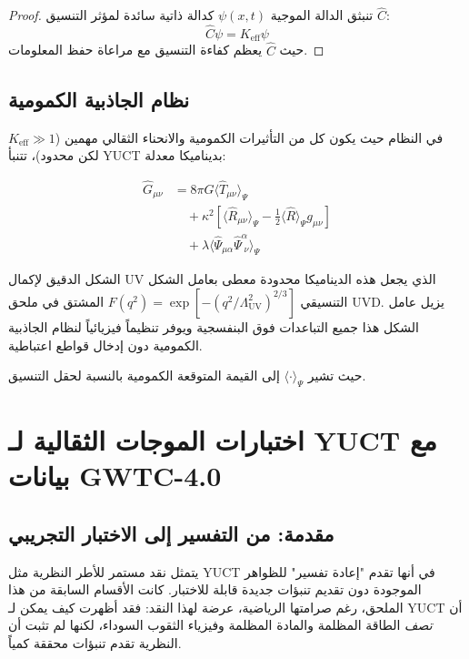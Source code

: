 \documentclass[11pt,a4paper]{article}
\theoremstyle{remark}
\newcommand{\Keff}{K_{\mathrm{eff}}}
\begin{document}
	\begin{proof}
		تنبثق الدالة الموجية $\psi(x,t)$ كدالة ذاتية سائدة لمؤثر التنسيق $\hat{C}$:
		\[
		\hat{C} \psi = \Keff \psi
		\]
		حيث $\hat{C}$ يعظم كفاءة التنسيق مع مراعاة حفظ المعلومات.
	\end{proof}
	
	\subsection{نظام الجاذبية الكمومية}
	
	في النظام حيث يكون كل من التأثيرات الكمومية والانحناء الثقالي مهمين ($\Keff \gg 1$ لكن محدود)، تتنبأ YUCT بديناميكا معدلة:
	
	\begin{equation}
		\begin{aligned}
			\hat{G}_{\mu\nu} &= 8\pi G \langle \hat{T}_{\mu\nu} \rangle_{\Psi} \\
			&\quad + \kappa^2 \left[ \langle \hat{R}_{\mu\nu} \rangle_{\Psi} - \frac{1}{2} \langle \hat{R} \rangle_{\Psi} g_{\mu\nu} \right] \\
			&\quad + \lambda \langle \hat{\Psi}_{\mu\alpha} \hat{\Psi}^{\alpha}_{\;\nu} \rangle_{\Psi}
		\end{aligned}
	\end{equation}
	
	الشكل الدقيق لإكمال UV الذي يجعل هذه الديناميكا محدودة معطى بعامل الشكل التنسيقي $F(q^2)=\exp[-(q^2/\Lambda_{\mathrm{UV}}^2)^{2/3}]$ المشتق في ملحق UVD. يزيل عامل الشكل هذا جميع التباعدات فوق البنفسجية ويوفر تنظيماً فيزيائياً لنظام الجاذبية الكمومية دون إدخال قواطع اعتباطية.
	
	حيث تشير $\langle \cdot \rangle_{\Psi}$ إلى القيمة المتوقعة الكمومية بالنسبة لحقل التنسيق.
	
	\section{اختبارات الموجات الثقالية لـ YUCT مع بيانات GWTC-4.0}
	\label{sec:gw-tests}
	
	\subsection{مقدمة: من التفسير إلى الاختبار التجريبي}
	
	يتمثل نقد مستمر للأطر النظرية مثل YUCT في أنها تقدم "إعادة تفسير" للظواهر الموجودة دون تقديم تنبؤات جديدة قابلة للاختبار. كانت الأقسام السابقة من هذا الملحق، رغم صرامتها الرياضية، عرضة لهذا النقد: فقد أظهرت كيف يمكن لـ YUCT أن \textit{تصف} الطاقة المظلمة والمادة المظلمة وفيزياء الثقوب السوداء، لكنها لم تثبت أن النظرية تقدم تنبؤات محققة كمياً.
	
\end{document}
